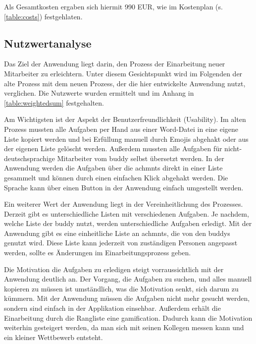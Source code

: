 \documentclass[11pt]{article}
\begin{document}
Als Gesamtkosten ergaben sich hiermit 990 EUR, wie im Kostenplan (s. \autoref{table:costs}) festgehlaten.




\subsection{Nutzwertanalyse}

Das Ziel der Anwendung liegt darin, den Prozess der Einarbeitung neuer Mitarbeiter zu erleichtern. Unter diesem Gesichtspunkt wird im Folgenden der alte Prozess
mit dem neuen Prozess, der die hier entwickelte Anwendung nutzt, verglichen. Die Nutzwerte wurden ermittelt und im Anhang in \autoref{table:weightedsum} festgehalten.

Am Wichtigsten ist der Aspekt der Benutzerfreundlichkeit (Usability). Im alten Prozess mussten alle Aufgaben per Hand aus einer Word-Datei in eine eigene
Liste kopiert werden und bei Erfüllung manuell durch Emojis abgehakt oder aus der eigenen Liste gelöscht werden. 
Außerdem mussten alle Aufgaben für nicht-deutschsprachige Mitarbeiter vom \Gls{buddy} selbst übersetzt werden.\newline
In der Anwendung werden die Aufgaben über die \glspl{achmnt} direkt in einer Liste gesammelt und können durch einen einfachen Klick abgehakt werden.
Die Sprache kann über einen Button in der Anwendung einfach umgestellt werden.

Ein weiterer Wert der Anwendung liegt in der Vereinheitlichung des Prozesses. Derzeit gibt es unterschiedliche Listen mit verschiedenen Aufgaben. Je nachdem, welche Liste der
\Gls{buddy} nutzt, werden unterschiedliche Aufgaben erledigt. \newline
Mit der Anwendung gibt es eine einheitliche Liste an \glspl{achmnt}, die von den \Glspl{buddy} genutzt wird. Diese Liste kann jederzeit von 
zuständigen Personen angepasst werden, sollte es Änderungen im Einarbeitungsprozess geben.

Die Motivation die Aufgaben zu erledigen steigt vorraussichtlich mit der Anwendung deutlich an. Der Vorgang, die Aufgaben zu suchen, und alles manuell kopieren
zu müssen ist umständlich, was die Motivation senkt, sich darum zu kümmern. Mit der Anwendung müssen die Aufgaben nicht mehr gesucht werden, sondern
sind einfach in der Applikation einsehbar. Außerdem erhält die Einarbeitung durch die Rangliste eine \Gls{gamification}. Dadurch kann die Motivation weiterhin gesteigert werden, 
da man sich mit seinen Kollegen messen kann und ein kleiner Wettbewerb entsteht.
\end{document}

